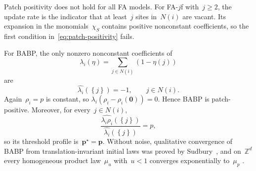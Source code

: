 \documentclass[EJP,preprint,NODS,nobera]{ejpecp}
\newcommand{\Z}{\mathbb{Z}}
\newcommand{\bb}[1]{\left(#1\right)}
\newcommand{\cb}[1]{\left\{#1\right\}}
\newcommand{\mb}[1]{\mathbf{#1}}
\begin{document}
\begin{example}[FA-$j$f, $j\geq2$]
\label{ex:pp-fajf}
Patch positivity does not hold for all FA models. For FA-$j$f with~$j\geq2$,
the update rate is the indicator that at least~$j$ sites in~$N(i)$ are vacant.
Its expansion in the monomials~$\chi_S$ contains positive nonconstant
coefficients, so the first condition in~\eqref{eq:patch-positivity} fails.
\end{example}

\begin{example}[BABP]
\label{ex:pp-babp}
For BABP, the only nonzero nonconstant coefficients of
\begin{equation*}
\lambda_i(\eta)
=
\sum_{j\in N(i)}\bb{1-\eta(j)}
\end{equation*}
are
\begin{equation*}
\widehat{\lambda_i}\bb{\cb{j}}=-1,
\qquad j\in N(i).
\end{equation*}
Again~$\rho_i=p$ is constant, so
$\lambda_i\bb{\rho_i-\rho_i(\mb0)}=0$. Hence BABP is patch-positive.
Moreover, for every~$j\in N(i)$,
\begin{equation*}
\frac{\widehat{\lambda_i\rho_i}\bb{\cb{j}}}
{\widehat{\lambda_i}\bb{\cb{j}}}
=
p,
\end{equation*}
so its threshold profile is~$\mb p^\star=\mb p$.
Without noise, qualitative convergence of BABP from translation-invariant
initial laws was proved by Sudbury~\cite{Sudbury1997}, and on~$\Z^d$ every
homogeneous product law~$\mu_u$ with~$u<1$ converges exponentially
to~$\mu_p$ \cite[Application~2 and Section~5.1.1]{MartinelliShapiraToninelli2025}.
\end{example}
\end{document}
